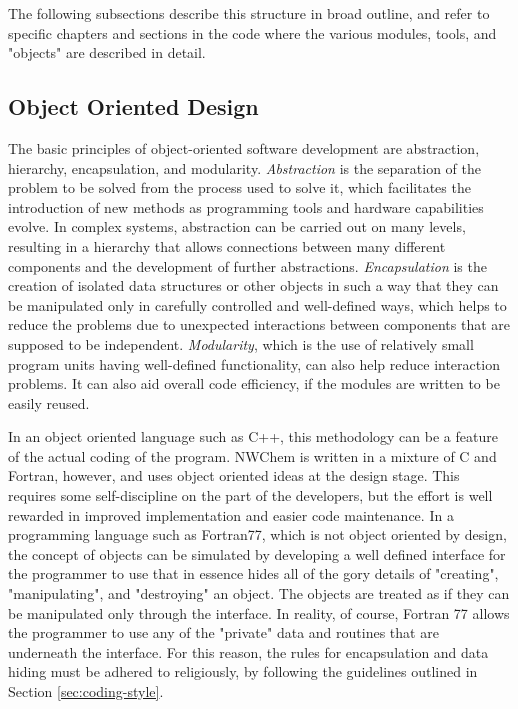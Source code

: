 The following subsections describe this structure in broad outline, and refer
to specific chapters and sections in the code where
the various modules, tools, and "objects" are described in detail.


\subsection{Object Oriented Design}
\label{sec:ood}

The basic principles of object-oriented software development are abstraction, 
hierarchy, encapsulation, and modularity.  {\em Abstraction} is the separation of the
problem to be solved from the process used to solve it, which facilitates the
introduction of new methods as programming tools and hardware capabilities
evolve.  In complex systems, abstraction can be carried out on many levels,
resulting in a hierarchy that allows connections between many different components
and the development of further abstractions. {\em Encapsulation} is the creation
of isolated data structures or other objects in such a way that they can be
manipulated only in carefully controlled and well-defined ways, which helps to
reduce the problems due to unexpected interactions between components that are
supposed to be independent.  {\em Modularity}, which is the use of relatively
small program units having well-defined functionality, can also help reduce
interaction problems.  It can also aid overall code efficiency, if the modules
are written to be easily reused.
 
In an object oriented language such as C++, this methodology can be a feature
of the actual coding of the program.  NWChem is written in a mixture of C and
Fortran, however, and uses object oriented ideas at the design stage.
This requires some self-discipline on the part of the developers, but the
effort is well rewarded in improved implementation and easier code maintenance.
In a programming language such as Fortran77, which is not object oriented by
design, the concept of objects can be simulated  by developing a
well defined interface
for the programmer to use that in essence hides all of the gory details of 
"creating", "manipulating", and "destroying" an object.  The objects are
treated as if they
can be manipulated only through the interface.  In reality, of course, Fortran 77
allows the programmer to use any of the "private" data and routines
that are underneath the interface.  For this reason, the rules for encapsulation
and data hiding must be adhered to religiously, by following the guidelines outlined
in Section \ref{sec:coding-style}.

